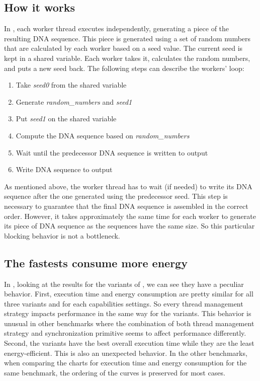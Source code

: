 \subsection{How it works}
In \fasta, each worker thread executes independently, generating a piece of the resulting DNA sequence. This piece is generated using a set of random numbers that are calculated by each worker based on a seed value. The current seed is kept in a shared variable. Each worker takes it, calculates the random numbers, and puts a new seed back. The following steps can describe the workers' loop:
\begin{enumerate}
	\item Take \textit{seed0} from the shared variable
	\item Generate \textit{random\_numbers} and \textit{seed1}
	\item Put \textit{seed1} on the shared variable
	\item Compute the DNA sequence based on \textit{random\_numbers}
	\item Wait until the predecessor DNA sequence is written to output
	\item Write DNA sequence to output
\end{enumerate}

As mentioned above, the worker thread has to wait (if needed) to write its DNA sequence after the one generated using the predecessor seed. This step is necessary to guarantee that the final DNA sequence is assembled in the correct order. However, it takes approximately the same time for each worker to generate its piece of DNA sequence as the sequences have the same size. So this particular blocking behavior is not a bottleneck.

\subsection{The fastests consume more energy}
In , looking at the results for the \TVar variants of \fasta, we can see they have a peculiar behavior. First, execution time and energy consumption are pretty similar for all three variants and for each capabilities settings. So every thread management strategy impacts performance in the same way for the \TVar variants. This behavior is unusual in other benchmarks where the combination of both thread management strategy and synchronization primitive seems to affect performance differently. Second, the \TVar variants have the best overall execution time while they are the least energy-efficient. This is also an unexpected behavior. In the other benchmarks, when comparing the charts for execution time and energy consumption for the same benchmark, the ordering of the curves is preserved for most cases.

